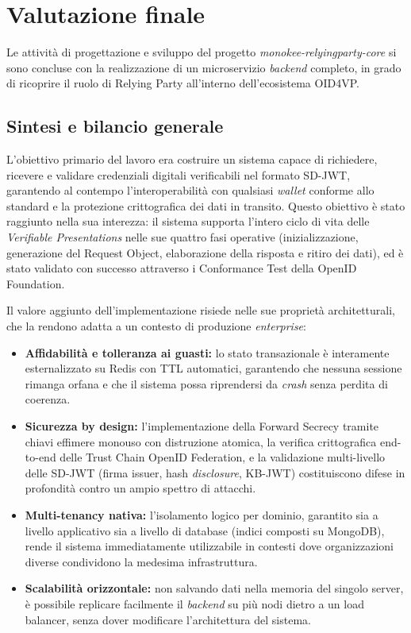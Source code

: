 \chapter{Valutazione finale}
\label{cap:valutazione_finale}

Le attività di progettazione e sviluppo del progetto \textit{monokee-relyingparty-core} si sono concluse con la realizzazione di un microservizio \textit{backend} completo, in grado di ricoprire il ruolo di Relying Party all'interno dell'ecosistema OID4VP.

\section{Sintesi e bilancio generale}
L'obiettivo primario del lavoro era costruire un sistema capace di richiedere, ricevere e validare credenziali digitali verificabili nel formato SD-JWT, garantendo al contempo l'interoperabilità con qualsiasi \textit{wallet} conforme allo standard e la protezione crittografica dei dati in transito. Questo obiettivo è stato raggiunto nella sua interezza: il sistema supporta l'intero ciclo di vita delle \textit{Verifiable Presentations} nelle sue quattro fasi operative (inizializzazione, generazione del Request Object, elaborazione della risposta e ritiro dei dati), ed è stato validato con successo attraverso i Conformance Test della OpenID Foundation.

Il valore aggiunto dell'implementazione risiede nelle sue proprietà architetturali, che la rendono adatta a un contesto di produzione \textit{enterprise}:

\begin{itemize}
    \item \textbf{Affidabilità e tolleranza ai guasti:} lo stato transazionale è interamente esternalizzato su Redis con TTL automatici, garantendo che nessuna sessione rimanga orfana e che il sistema possa riprendersi da \textit{crash} senza perdita di coerenza.
    \item \textbf{Sicurezza by design:} l'implementazione della Forward Secrecy tramite chiavi effimere monouso con distruzione atomica, la verifica crittografica end-to-end delle Trust Chain OpenID Federation, e la validazione multi-livello delle SD-JWT (firma issuer, hash \textit{disclosure}, KB-JWT) costituiscono difese in profondità contro un ampio spettro di attacchi.
    \item \textbf{Multi-tenancy nativa:} l'isolamento logico per dominio, garantito sia a livello applicativo sia a livello di database (indici composti su MongoDB), rende il sistema immediatamente utilizzabile in contesti  dove organizzazioni diverse condividono la medesima infrastruttura.
    \item \textbf{Scalabilità orizzontale:} non salvando dati nella memoria del singolo server, è possibile replicare facilmente il \textit{backend} su più nodi dietro a un load balancer, senza dover modificare l'architettura del sistema.
\end{itemize}

